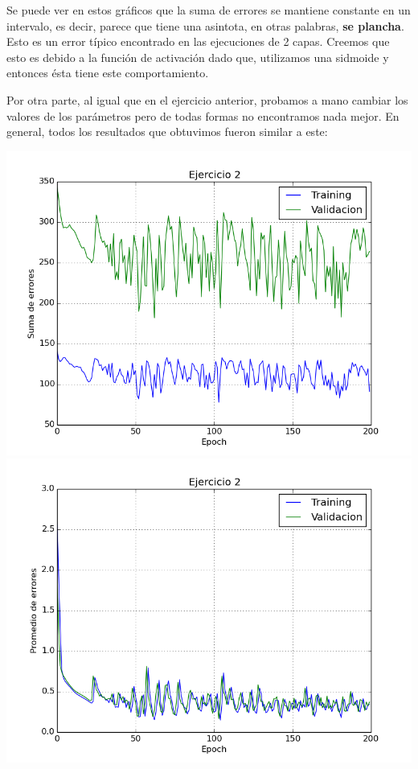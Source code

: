 Se puede ver en estos gráficos que la suma de errores se mantiene constante en un intervalo, es decir, parece que tiene una asintota, en otras palabras, \textbf{se plancha}. Esto es un error típico encontrado en las ejecuciones de 2 capas. Creemos que esto es debido a la función de activación dado que, utilizamos una sidmoide y entonces ésta tiene este comportamiento.

Por otra parte, al igual que en el ejercicio anterior, probamos a mano cambiar los valores de los parámetros pero de todas formas no encontramos nada mejor. En general, todos los resultados que obtuvimos fueron similar a este:

\includegraphics[scale=0.4]{img/ccsum}
\includegraphics[scale=0.4]{img/bbmean}


